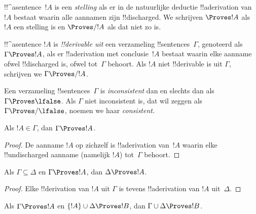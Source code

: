 \documentclass[openany]{memoir}
\begin{document}
\begin{defn}[Stellingen]
!!^a{sentence}~$!A$ is een \emph{stelling} als er in de natuurlijke
deductie !!a{derivation} van~$!A$ bestaat waarin alle aannamen zijn
!!{discharged}. We schrijven $\Proves !A$ als $!A$ een stelling is en
$\Proves/ !A$ als dat niet zo is.
\end{defn}

\begin{defn}[!!^{derivability}]
!!^a{sentence} $!A$ is \emph{!!{derivable} uit} een verzameling
!!{sentence}s~$\Gamma$, genoteerd als $\Gamma \Proves !A$, als er
!!a{derivation} met conclusie~$!A$ bestaat waarin elke aanname ofwel
!!{discharged} is, ofwel tot~$\Gamma$ behoort. Als $!A$ niet
!!{derivable} is uit $\Gamma$, schrijven we $\Gamma \Proves/ !A$.
\end{defn}

\begin{defn}[Consistentie]
Een verzameling !!{sentence}s~$\Gamma$ is \emph{inconsistent} dan en
slechts dan als $\Gamma \Proves \lfalse$. Als $\Gamma$ niet
inconsistent is, dat wil zeggen als $\Gamma \Proves/ \lfalse$, noemen
we haar \emph{consistent}.
\end{defn}

\begin{prop}[Reflexiviteit]
Als $!A \in \Gamma$, dan $\Gamma \Proves !A$.
\end{prop}

\begin{proof}
De aanname $!A$ op zichzelf is !!a{derivation} van~$!A$ waarin elke
!!{undischarged} aanname (namelijk $!A$) tot~$\Gamma$ behoort.
\end{proof}
  

\begin{prop}[Monotonie]
Als $\Gamma \subseteq \Delta$ en $\Gamma \Proves !A$, dan $\Delta
\Proves !A$.
\end{prop}

\begin{proof}
Elke !!{derivation} van $!A$ uit $\Gamma$ is tevens !!a{derivation}
van $!A$ uit~$\Delta$.
\end{proof}

\begin{prop}[Transitiviteit]
Als $\Gamma \Proves !A$ en $\{!A\} \cup \Delta \Proves
!B$, dan $\Gamma \cup \Delta \Proves !B$.
\end{prop}
\end{document}
